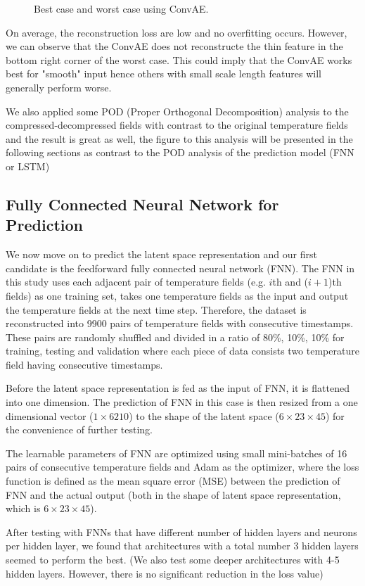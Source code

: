 \begin{figure}[H]
\caption{Best case and worst case using ConvAE.}
\end{figure}


On average, the reconstruction loss are low and no overfitting occurs. However, we can observe that the ConvAE does not reconstructe the thin feature in the bottom right corner of the worst case. This could imply that the ConvAE works best for "smooth" input hence others with small scale length features will generally perform worse.

We also applied some POD (Proper Orthogonal Decomposition) analysis to the compressed-decompressed fields with contrast to the original temperature fields and the result is great as well, the figure to this analysis will be presented in the following sections as contrast to the POD analysis of the prediction model (FNN or LSTM) 


\subsection{Fully Connected Neural Network for Prediction}

We now move on to predict the latent space representation and our first candidate is the feedforward fully connected neural network (FNN). The FNN in this study uses each adjacent pair of temperature fields (e.g. $i$th and ($i+1$)th fields) as one training set, takes one temperature fields as the input and output the temperature fields at the next time step. Therefore, the dataset is reconstructed into 9900 pairs of temperature fields with consecutive timestamps. These pairs are randomly shuffled and divided in a ratio of 80\%, 10\%, 10\% for training, testing and validation where each piece of data consists two temperature field having consecutive timestamps.

Before the latent space representation is fed as the input of FNN, it is flattened into one dimension. The prediction of FNN in this case is then resized from a one dimensional vector ($1 \times 6210$) to the shape of the latent space ($6 \times 23 \times 45$) for the convenience of further testing.

The learnable parameters of FNN are optimized using small mini-batches of 16 pairs of consecutive temperature fields and Adam as the optimizer, where the loss function is defined as the mean square error (MSE) between the prediction of FNN and the actual output (both in the shape of latent space representation, which is $6 \times 23 \times 45$).

After testing with FNNs that have different number of hidden layers and neurons per hidden layer, we found that architectures with a total number 3 hidden layers seemed to perform the best. (We also test some deeper architectures with 4-5 hidden layers. However, there is no significant reduction in the loss value)

